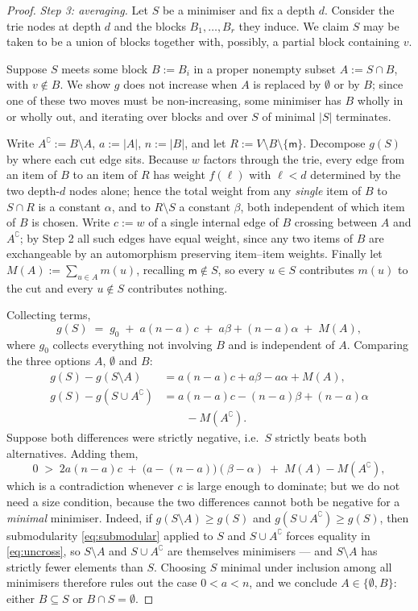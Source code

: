 \documentclass[11pt,twocolumn,a4paper]{article}
\theoremstyle{thmstyle}
\theoremstyle{definition}
\theoremstyle{remark}
\newcommand{\V}{V}
\newcommand{\wt}{w}
\newcommand{\med}{\mathsf{m}}
\newcommand{\co}{\complement}
\newcommand{\abs}[1]{\lvert#1\rvert}
\begin{document}
\begin{proof}
\emph{Step 3: averaging.} Let $S$ be a minimiser and fix a depth $d$.
Consider the trie nodes at depth $d$ and the blocks $B_1,\dots,B_r$
they induce. We claim $S$ may be taken to be a union of blocks
together with, possibly, a partial block containing $v$.

Suppose $S$ meets some block $B := B_i$ in a proper nonempty subset
$A := S \cap B$, with $v \notin B$. We show $g$ does not increase when
$A$ is replaced by $\emptyset$ or by $B$; since one of these two moves
must be non-increasing, some minimiser has $B$ wholly in or wholly out,
and iterating over blocks and over $S$ of minimal $\abs{S}$ terminates.

Write $A^\co := B \setminus A$, $a := \abs{A}$, $n := \abs{B}$, and let
$R := \V \setminus B \setminus \{\med\}$. Decompose $g(S)$ by where each
cut edge sits. Because $\wt$ factors through the trie, every edge from
an item of $B$ to an item of $R$ has weight $f(\ell)$ with
$\ell < d$ determined by the two depth-$d$ nodes alone; hence the total
weight from any \emph{single} item of $B$ to $S \cap R$ is a constant
$\alpha$, and to $R \setminus S$ a constant $\beta$, both independent of
which item of $B$ is chosen. Write $c := \wt$ of a single internal edge
of $B$ crossing between $A$ and $A^\co$; by Step 2 all such edges have
equal weight, since any two items of $B$ are exchangeable by an
automorphism preserving item--item weights. Finally let
$M(A) := \sum_{u \in A} m(u)$, recalling $\med \notin S$, so every
$u \in S$ contributes $m(u)$ to the cut and every $u \notin S$
contributes nothing.

Collecting terms,
\[
  g(S) \;=\; g_0 \;+\; a(n-a)\,c \;+\; a\beta + (n-a)\alpha
        \;+\; M(A),
\]
where $g_0$ collects everything not involving $B$ and is independent of
$A$. Comparing the three options $A$, $\emptyset$ and $B$:
\begin{align*}
  g(S) - g(S \setminus A) &= a(n-a)c + a\beta - a\alpha + M(A), \\
  g(S) - g(S \cup A^\co)  &= a(n-a)c - (n-a)\beta + (n-a)\alpha \\
                          &\qquad {} - M(A^\co).
\end{align*}
Suppose both differences were strictly negative, i.e.\ $S$ strictly
beats both alternatives. Adding them,
\[
  0 \;>\; 2a(n-a)c \;+\; \bigl(a - (n-a)\bigr)(\beta-\alpha)
        \;+\; M(A) - M(A^\co),
\]
which is a contradiction whenever $c$ is large enough to dominate; but
we do not need a size condition, because the two differences cannot
both be negative for a \emph{minimal} minimiser. Indeed, if
$g(S \setminus A) \geq g(S)$ and $g(S \cup A^\co) \geq g(S)$, then
submodularity \eqref{eq:submodular} applied to $S$ and $S \cup A^\co$
forces equality in \eqref{eq:uncross}, so $S \setminus A$ and
$S \cup A^\co$ are themselves minimisers --- and $S \setminus A$ has
strictly fewer elements than $S$. Choosing $S$ minimal under inclusion
among all minimisers therefore rules out the case $0 < a < n$, and
we conclude $A \in \{\emptyset, B\}$: either $B \subseteq S$ or
$B \cap S = \emptyset$.


\end{proof}
\end{document}
